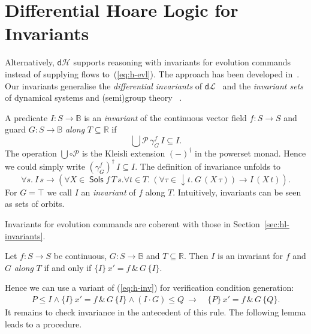 \documentclass[envcountsame,envcountsect]{llncs}
\newcommand{\dL}{\mathsf{d}\mathcal{L}}
\newcommand{\dH}{\mathsf{d}\mathcal{H}}
\newcommand{\Pow}{\mathcal{P}}
\newcommand{\reals}{\mathbb{R}}
\newcommand{\bools}{\mathbb{B}}
\newcommand{\Sols}{\mathop{\mathsf{Sols}}}
\begin{document}

\section{Differential Hoare Logic for Invariants}\label{sec:hoare-inv}

Alternatively, $\dH$ supports reasoning with invariants for evolution
commands instead of supplying flows to~(\ref{eq:h-evl}).  The approach
has been developed in~\cite{MuniveS19}. Our invariants generalise the
\emph{differential invariants} of $\dL$~\cite{Platzer18} and the
\emph{invariant sets} of dynamical systems and (semi)group
theory~\cite{Teschl12} .

A predicate $I:S\to\bools$ is an \emph{invariant} of the continuous
vector field $f:S\to S$ and guard $G:S\to\bools$ \emph{along}
$T\subseteq \reals$ if
\begin{equation*}
\bigcup \Pow\, \gamma^f_G\, I\subseteq  I.
\end{equation*}
The operation $\bigcup\circ\Pow$ is the Kleisli extension $(-)^\dagger$
in the powerset monad. Hence we could simply write
$(\gamma^f_G)^\dagger\, I \subseteq I$. The definition of invariance
unfolds to
\begin{equation*}
  \forall s.\ I\, s \to (\forall X\in\Sols f\, T\, s.\forall t\in T.\ (\forall \tau\in {\downarrow}t.\ G\, (X\, \tau)) \to I\, (X\, t)).
\end{equation*}
For $G=\top$ we call $I$ an \emph{invariant} of $f$ along $T$.
Intuitively, invariants can be seen as sets of orbits.

Invariants for evolution commands are coherent with those in Section~\ref{sec:hl-invariants}.
\begin{proposition}\label{P:inv-prop}
  Let $f:S\to S$ be continuous, $G:S\to\bools$ and
  $T\subseteq \reals$. Then $I$ is an invariant for $f$ and $G$ \emph{along} $T$ if and only if
$ \{I\}\, x' = f\, \&\, G\, \{I\}$.
\end{proposition}
Hence we can use a variant of (\ref{eq:h-inv}) for verification condition generation:
\begin{align}
  P\le I \land \{I\}\, x' = f\, \&\, G\, \{I\}\land (I\cdot G)\le Q\ \rightarrow\
  &\{P\}\, x' = f\, \&\, G\, \{Q\}.\label{eq:h-invg}\tag{h-invg}
\end{align}
It remains to check invariance in the antecedent of this rule. The
following lemma leads to a procedure.
\end{document}
